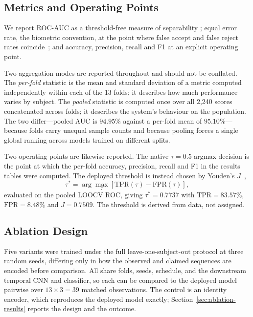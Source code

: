 \documentclass[journal]{IEEEtran}
\begin{document}
\subsection{Metrics and Operating Points}

We report ROC-AUC as a threshold-free measure of separability
\cite{fawcett_roc}; equal error rate, the biometric convention, at the point
where false accept and false reject rates coincide~\cite{iso19795}; and
accuracy, precision, recall and F1 at an explicit operating point.

Two aggregation modes are reported throughout and should not be conflated. The
\emph{per-fold} statistic is the mean and standard deviation of a metric
computed independently within each of the 13 folds; it describes how much
performance varies by subject. The \emph{pooled} statistic is computed once
over all 2{,}240 scores concatenated across folds; it describes the system's
behaviour on the population. The two differ---pooled AUC is $94.95\%$ against a
per-fold mean of $95.10\%$---because folds carry unequal sample counts and
because pooling forces a single global ranking across models trained on
different splits.

Two operating points are likewise reported. The native $\tau = 0.5$ argmax
decision is the point at which the per-fold accuracy, precision, recall and F1
in the results tables were computed. The deployed threshold is instead chosen by
Youden's $J$~\cite{youden,fluss},
\begin{equation}
\tau^* = \arg\max_\tau\left[\mathrm{TPR}(\tau) - \mathrm{FPR}(\tau)\right],
\end{equation}
evaluated on the pooled LOOCV ROC, giving $\tau^* = 0.7737$ with
$\mathrm{TPR} = 83.57\%$, $\mathrm{FPR} = 8.48\%$ and $J = 0.7509$. The
threshold is derived from data, not assigned.

\subsection{Ablation Design}

Five variants were trained under the full leave-one-subject-out protocol at
three random seeds, differing only in how the observed and claimed sequences
are encoded before comparison. All share folds, seeds, schedule, and the
downstream temporal CNN and classifier, so each can be compared to the deployed
model pairwise over $13 \times 3 = 39$ matched observations. The control is an
identity encoder, which reproduces the deployed model exactly;
Section~\ref{sec:ablation-results} reports the design and the outcome.
\end{document}
